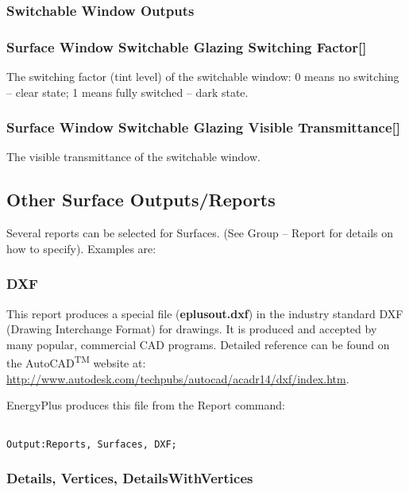 \subsubsection{Switchable Window Outputs}\label{switchable-window-outputs}

\subsubsection{Surface Window Switchable Glazing Switching Factor{[]}}\label{surface-window-switchable-glazing-switching-factor}

The switching factor (tint level) of the switchable window: 0 means no switching -- clear state; 1 means fully switched -- dark state.

\subsubsection{Surface Window Switchable Glazing Visible Transmittance{[]}}\label{surface-window-switchable-glazing-visible-transmittance}

The visible transmittance of the switchable window.

\subsection{Other Surface Outputs/Reports}\label{other-surface-outputsreports}

Several reports can be selected for Surfaces. (See Group -- Report for details on how to specify). Examples are:

\subsubsection{DXF}\label{dxf}

This report produces a special file (\textbf{eplusout.dxf}) in the industry standard DXF (Drawing Interchange Format) for drawings. It is produced and accepted by many popular, commercial CAD programs. Detailed reference can be found on the AutoCAD\textsuperscript{TM} website at: \url{http://www.autodesk.com/techpubs/autocad/acadr14/dxf/index.htm}.

EnergyPlus produces this file from the Report command:

\begin{lstlisting}

Output:Reports, Surfaces, DXF;
\end{lstlisting}

\subsubsection{Details, Vertices, DetailsWithVertices}\label{details-vertices-detailswithvertices}

